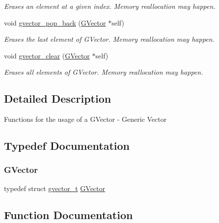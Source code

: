 \begin{DoxyCompactItemize}
\begin{DoxyCompactList}\small\item\em Erases an element at a given index. Memory reallocation may happen. \end{DoxyCompactList}\item 
void \hyperlink{group___g_vector_ga6fd765130f11b97b8fcca59d7c4e98d1}{gvector\+\_\+pop\+\_\+back} (\hyperlink{group___g_vector_ga6d90d5e6b721779a43354f2752b79281}{G\+Vector} $\ast$self)
\begin{DoxyCompactList}\small\item\em Erases the last element of G\+Vector. Memory reallocation may happen. \end{DoxyCompactList}\item 
void \hyperlink{group___g_vector_ga58f71f3cb3c10d00005e3f58951a9184}{gvector\+\_\+clear} (\hyperlink{group___g_vector_ga6d90d5e6b721779a43354f2752b79281}{G\+Vector} $\ast$self)
\begin{DoxyCompactList}\small\item\em Erases all elements of G\+Vector. Memory reallocation may happen. \end{DoxyCompactList}\end{DoxyCompactItemize}


\subsection{Detailed Description}
Functions for the usage of a G\+Vector -\/ Generic Vector 

\subsection{Typedef Documentation}
\hypertarget{group___g_vector_ga6d90d5e6b721779a43354f2752b79281}{}\label{group___g_vector_ga6d90d5e6b721779a43354f2752b79281} 
\subsubsection{\texorpdfstring{G\+Vector}{GVector}}
{\footnotesize\ttfamily typedef struct \hyperlink{structgvector__t}{gvector\+\_\+t} \hyperlink{group___g_vector_ga6d90d5e6b721779a43354f2752b79281}{G\+Vector}}



\subsection{Function Documentation}
\hypertarget{group___g_vector_gab3513aa2ddf9e3016d4be27fff810b39}{}\label{group___g_vector_gab3513aa2ddf9e3016d4be27fff810b39} 

